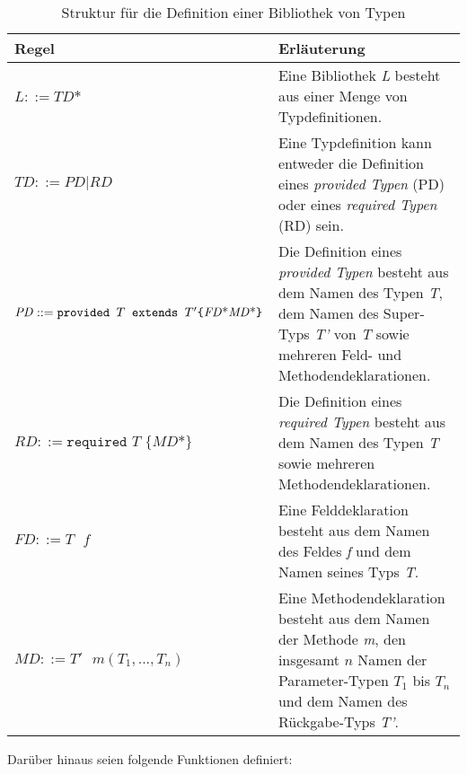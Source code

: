 \begin{table}[h!]
\centering
\begin{tabular}{|p{4.5cm}|p{7.5cm}|}
\hline
\hline
\centering\textbf{Regel} & \textbf{Erläuterung} \\
\hline
\hline
$\mathit{L} ::= \mathit{TD}\text{*}$ & Eine Bibliothek \emph{L} besteht aus einer Menge von Typdefinitionen.\\
\hline
$\mathit{TD} ::= \mathit{PD} | \mathit{RD}$ & Eine Typdefinition kann entweder die Definition eines \emph{provided Typen} (PD) oder eines \emph{required Typen} (RD) sein.\\
\hline
$\mathit{PD} ::= \newline\texttt{provided }T \texttt{ extends } T' \newline  \texttt{\{} \mathit{FD}\text{*} \mathit{MD}\text{*}\texttt{\}}$& Die Definition eines \emph{provided Typen} besteht aus dem Namen des Typen \emph{T}, dem Namen des Super-Typs \emph{T'} von \emph{T} sowie mehreren Feld- und Methodendeklarationen.\\
\hline
$\mathit{RD} ::= \texttt{required } T \texttt{ \{}\mathit{MD}\text{*}\texttt{\}}$ & Die Definition eines \emph{required Typen} besteht aus dem Namen des Typen \emph{T} sowie mehreren Methodendeklarationen.\\
\hline
$\mathit{FD} ::= T \texttt{ }\mathit{f}$ & Eine Felddeklaration besteht aus dem Namen des Feldes \emph{f} und dem Namen seines Typs \emph{T}.\\
\hline
$\mathit{MD} ::= \mathit{T'}\texttt{ }\mathit{m(T_1,...,T_n)}$ & Eine Methodendeklaration besteht aus dem Namen der Methode \emph{m}, den insgesamt $n$ Namen der Parameter-Typen $T_1$ bis $T_n$ und dem Namen des Rückgabe-Typs \emph{T'}.\\
\hline
\hline
\end{tabular}
\caption{Struktur für die Definition einer Bibliothek von Typen}
 \label{tab_typeStruct}
\end{table}
\noindent
Darüber hinaus seien folgende Funktionen definiert:

